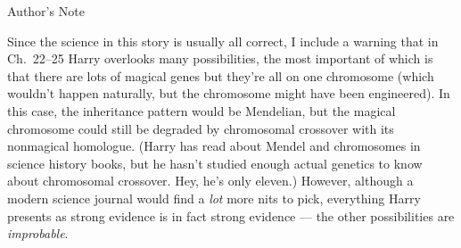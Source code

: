 \thispagestyle{empty}
{
\vspace*{6\baselineskip}
\itshape
\begin{center}
Author's Note
\end{center}

Since the science in this story is usually all correct, I include a warning
that in Ch.~22--25 Harry overlooks many possibilities, the most important of
which is that there are lots of magical genes but they're all on one chromosome
(which wouldn't happen naturally, but the chromosome might have been
engineered). In this case, the inheritance pattern would be Mendelian, but the
magical chromosome could still be degraded by chromosomal crossover with its
nonmagical homologue. (Harry has read about Mendel and chromosomes in science
history books, but he hasn't studied enough actual genetics to know about
chromosomal crossover. Hey, he's only eleven.) However, although a modern
science journal would find a \emph{lot} more nits to pick, everything Harry
presents as strong evidence is in fact strong evidence --- the other
possibilities are \emph{improbable}.
}

